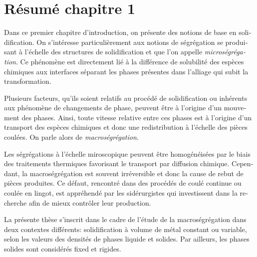 \clearpage
\section*{Résumé chapitre 1}

\begin{otherlanguage}{french}
{\small

Dans ce premier chapitre d'introduction, on présente des notions de base en solidification. 
On s'intéresse particulièrement aux notions de ségrégation se produisant à l'échelle des structures 
de solidification et que l'on appelle \emph{microségrégation}. Ce phénomène est directement lié à la 
différence de solubilité des espèces chimiques aux interfaces séparant les phases présentes dans 
l'alliage qui subit la transformation.


Plusieurs facteurs, qu'ils soient relatifs au procédé de solidification ou inhérents aux phénomène de changements de phase,
peuvent être à l'origine d'un mouvement des phases. 
Ainsi, toute vitesse relative entre ces phases est à l'origine d'un transport des espèces chimiques
et donc une redistribution à l'échelle des pièces coulées. On parle alors de \emph{macroségrégation}.


Les ségrégations à l'échelle miroscopique peuvent être homogénéisées par le biais 
des traitements thermiques favorisant le transport par diffusion chimique.
Cependant, la macroségrégation est souvent irréversible et donc la cause de rebut de pièces produites. 
Ce défaut, rencontré dans des procédés de coulé continue ou coulée en lingot, est appréhendé par les
sidérurgistes qui investissent dans la recherche afin de mieux contrôler leur production.

La présente thèse s'inscrit dans le cadre de l'étude de la macroségrégation dans deux contextes différents:
solidification à volume de métal constant ou variable, selon les valeurs des densités de phases liquide et solides. 
Par ailleurs, les phases solides sont considérés fixed et rigides.

}
\end{otherlanguage}
